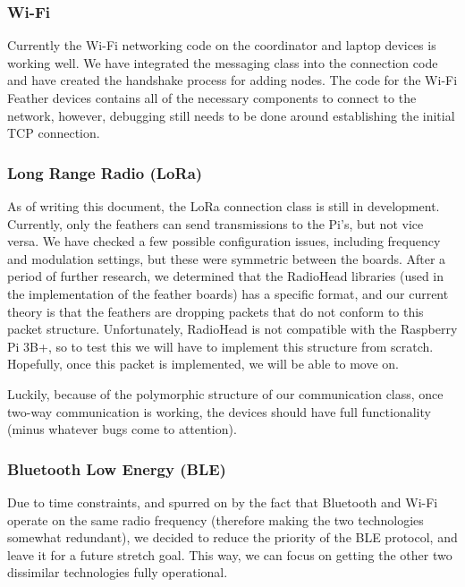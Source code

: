 \documentclass[tikz,a4paper,titlepage]{article}
\begin{document}
\subsubsection{Wi-Fi}

Currently the Wi-Fi networking code on the coordinator and laptop devices is working well. We have integrated the messaging class into the connection code and have created the handshake process for adding nodes. The code for the Wi-Fi Feather devices contains all of the necessary components to connect to the network, however, debugging still needs to be done around establishing the initial TCP connection.

\subsubsection{Long Range Radio (LoRa)}

As of writing this document, the LoRa connection class is still in development. Currently, only the feathers can send transmissions to the Pi's, but not vice versa. We have checked a few possible configuration issues, including frequency and modulation settings, but these were symmetric between the boards. After a period of further research, we determined that the RadioHead libraries (used in the implementation of the feather boards) has a specific format, and our current theory is that the feathers are dropping packets that do not conform to this packet structure. Unfortunately, RadioHead is not compatible with the Raspberry Pi 3B+, so to test this we will have to implement this structure from scratch. Hopefully, once this packet is implemented, we will be able to move on.

Luckily, because of the polymorphic structure of our communication class, once two-way communication is working, the devices should have full functionality (minus whatever bugs come to attention).

\subsubsection{Bluetooth Low Energy (BLE)}

Due to time constraints, and spurred on by the fact that Bluetooth and Wi-Fi operate on the same radio frequency (therefore making the two technologies somewhat redundant), we decided to reduce the priority of the BLE protocol, and leave it for a future stretch goal. This way, we can focus on getting the other two dissimilar technologies fully operational.
\end{document}
